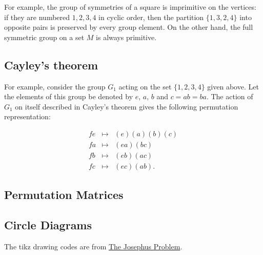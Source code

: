 For example, the group of symmetries of a square is imprimitive on the vertices: if they are numbered
$1, 2, 3, 4$ in cyclic order, then the partition $\{{1, 3}, {2, 4}\}$ into opposite pairs is preserved by
every group element. On the other hand, the full symmetric group on a set $M$ is always primitive.

\subsection{Cayley's theorem}

For example, consider the group $G_1$ acting on the set $\{1, 2, 3, 4\}$ given above. Let the elements of
this group be denoted by $e$, $a$, $b$ and $c = ab = ba$. The action of $G_1$ on itself described in
Cayley's theorem gives the following permutation representation:
\begin{fleqn}
    \begin{equation*}
        \begin{array}{lll}
            fe & \mapsto & (e)(a)(b)(c) \\
            fa & \mapsto & (ea)(bc)     \\
            fb & \mapsto & (eb)(ac)     \\
            fc & \mapsto & (ec)(ab).
        \end{array}
    \end{equation*}
\end{fleqn}

\subsection{Permutation Matrices}

\subsection{Circle Diagrams}\label{sub_circle_diagrams}
The tikz drawing codes are from \href{https://charlesreid1.github.io/the-josephus-problem-part-1-the-problem.html}{The Josephus Problem}.

